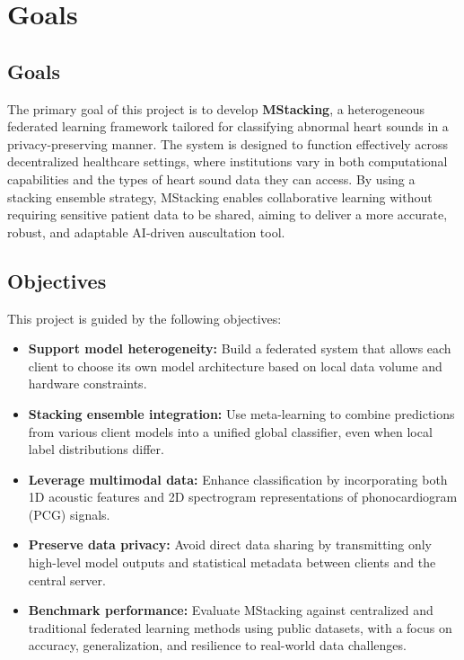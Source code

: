 \chapter{Goals}

\section{Goals}
The primary goal of this project is to develop \textbf{MStacking}, a heterogeneous federated learning framework tailored for classifying abnormal heart sounds in a privacy-preserving manner. The system is designed to function effectively across decentralized healthcare settings, where institutions vary in both computational capabilities and the types of heart sound data they can access. By using a stacking ensemble strategy, MStacking enables collaborative learning without requiring sensitive patient data to be shared, aiming to deliver a more accurate, robust, and adaptable AI-driven auscultation tool.

\section{Objectives}
This project is guided by the following objectives:
\begin{itemize}
    \item \textbf{Support model heterogeneity:} Build a federated system that allows each client to choose its own model architecture based on local data volume and hardware constraints.
    \item \textbf{Stacking ensemble integration:} Use meta-learning to combine predictions from various client models into a unified global classifier, even when local label distributions differ.
    \item \textbf{Leverage multimodal data:} Enhance classification by incorporating both 1D acoustic features and 2D spectrogram representations of phonocardiogram (PCG) signals.
    \item \textbf{Preserve data privacy:} Avoid direct data sharing by transmitting only high-level model outputs and statistical metadata between clients and the central server.
    \item \textbf{Benchmark performance:} Evaluate MStacking against centralized and traditional federated learning methods using public datasets, with a focus on accuracy, generalization, and resilience to real-world data challenges.
\end{itemize}

